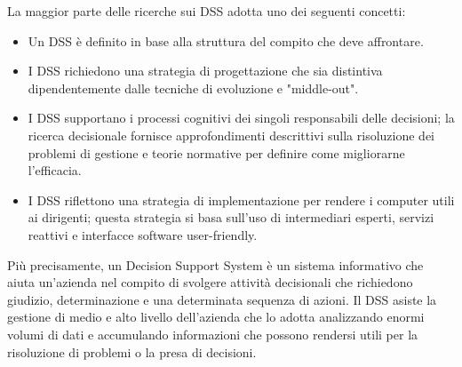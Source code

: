 La maggior parte delle ricerche sui DSS adotta uno dei seguenti concetti:\cite{mit_keen_dss}

\begin{itemize}
    \item Un DSS è definito in base alla struttura del compito che deve affrontare.
    \item I DSS richiedono una strategia di progettazione che sia distintiva dipendentemente dalle tecniche di evoluzione e "middle-out".
    \item I DSS supportano i processi cognitivi dei singoli responsabili delle decisioni; la ricerca decisionale fornisce approfondimenti descrittivi sulla risoluzione dei problemi di gestione e teorie normative per definire come migliorarne l'efficacia.
    \item I DSS riflettono una strategia di implementazione per rendere i computer utili ai dirigenti; questa strategia si basa sull'uso di intermediari esperti, servizi reattivi e interfacce software user-friendly.
\end{itemize}

Più precisamente, un Decision Support System è un sistema informativo che aiuta un'azienda nel compito di svolgere attività decisionali che richiedono giudizio, determinazione e una determinata sequenza di azioni. Il DSS asiste la gestione di medio e alto livello dell'azienda che lo adotta analizzando enormi volumi di dati e accumulando informazioni che possono rendersi utili per la risoluzione di problemi o la presa di decisioni.\cite{cfi_dss}

